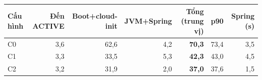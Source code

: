 \begin{tabular}{@{}lrrrrrr@{}}
\toprule
Cấu hình & Đến ACTIVE & Boot+cloud-init & JVM+Spring & Tổng (trung vị) & p90 & Spring (s) \\
\midrule
C0 & 3,6 & 62,6 & 4,2 & \textbf{70,3} & 73,4 & 3,5 \\
C1 & 3,3 & 33,5 & 5,3 & \textbf{42,3} & 43,0 & 4,5 \\
C2 & 3,2 & 31,9 & 2,0 & \textbf{37,0} & 37,6 & 1,5 \\
\bottomrule
\end{tabular}